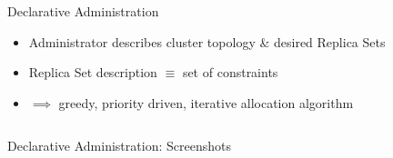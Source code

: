 \documentclass[11pt,aspectratio=169]{beamer}
\begin{document}
    \begin{frame}{Declarative Administration}
        
        \begin{itemize}
           \item<1-> Administrator describes cluster topology \& desired Replica Sets
           \item<2-> Replica Set description $\equiv$ set of constraints
           \item<3-> $\implies$ \alert<3>{greedy}, \alert<4>{priority driven}, \alert<5>{iterative} allocation algorithm
        \end{itemize}
        
        \begin{columns}
            \begin{column}{0.5\linewidth}
            \end{column}
            \begin{column}{0.5\linewidth}
            \end{column}
        \end{columns}
       
        
    \end{frame}
    
    
    \begin{frame}{Declarative Administration: Screenshots}
         \begin{columns}
             \begin{column}{0.5\linewidth}
                \end{column}
                \begin{column}{0.5\linewidth}
                \end{column}
        \end{columns}
    \end{frame}
    
\end{document}
